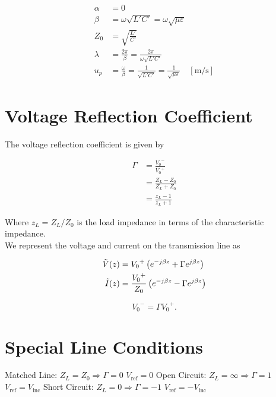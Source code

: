 \documentclass{report}
\begin{document}
\begin{align*}
	\alpha  & = 0                                                                                                               \\
	\beta   & = \omega \sqrt{L'C'} = \omega \sqrt{\mu\varepsilon}                                                               \\
	Z_0     & = \sqrt{\frac{L'}{C'}}                                                                                            \\
	\lambda & = \frac{2\pi}{\beta} = \frac{2\pi}{\omega \sqrt{L'C'}}                                                            \\
	u_p     & = \frac{\omega}{\beta} = \frac{1}{\sqrt{L'C'}} = \frac{1}{\sqrt{\mu\varepsilon}} \quad [\unit{\meter\per\second}]
\end{align*}

\section{Voltage Reflection Coefficient}

The voltage reflection coefficient is given by

\begin{align*}
	\Gamma & = \frac{{V_0}^-}{{V_0}^+}     \\
	       & = \frac{Z_L - Z_0}{Z_L + Z_0} \\
	       & = \frac{z_L -1}{z_L + 1}
\end{align*}

Where $z_L = Z_L/Z_0$ is the load impedance in terms of the characteristic impedance.\\

We represent the voltage and current on the transmission line as

\begin{align*}
	\tilde{V}(z) & = {V_0}^+ \left( e^{-j\beta z} + \Gamma e^{j\beta z} \right)             \\
	\tilde{I}(z) & = \frac{{V_0}^+}{Z_0} \left( e^{-j\beta z} - \Gamma e^{j\beta z} \right)
\end{align*}

\[
	{V_0}^- = \Gamma {V_0}^+
	.\]

\section{Special Line Conditions}

\begin{enumerate}
	\ii Matched Line: $Z_L = Z_0 \Rightarrow \Gamma = 0$ $V_\text{ref} = 0$
	\ii Open Circuit: $Z_L = \infty \Rightarrow \Gamma = 1$ $V_\text{ref} = V_\text{inc}$
	\ii Short Circuit: $Z_L = 0 \Rightarrow \Gamma = -1$ $V_\text{ref} = -V_\text{inc}$
\end{enumerate}
\end{document}
